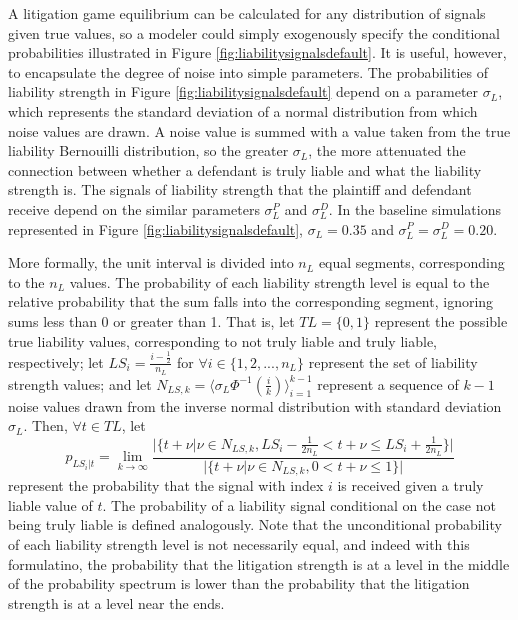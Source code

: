 \documentclass{article}
\begin{document}
A litigation game equilibrium can be calculated for any distribution of signals given true values, so a modeler could simply exogenously specify the conditional probabilities illustrated in Figure \ref{fig:liabilitysignalsdefault}. It is useful, however, to encapsulate the degree of noise into simple parameters. The probabilities of liability strength in Figure \ref{fig:liabilitysignalsdefault} depend on a parameter $\sigma_{L}$, which represents the standard deviation of a normal distribution from which noise values are drawn. A noise value is summed with a value taken from the true liability Bernouilli distribution, so the greater $\sigma_{L}$, the more attenuated the connection between whether a defendant is truly liable and what the liability strength is. The signals of liability strength that the plaintiff and defendant receive depend on the similar parameters $\sigma_{L}^P$ and $\sigma_{L}^D$. In the baseline simulations represented in Figure \ref{fig:liabilitysignalsdefault}, $\sigma_{L}=0.35$ and $\sigma_{L}^P=\sigma_{L}^D=0.20$.

More formally, the unit interval is divided into $n_{L}$ equal segments, corresponding to the $n_{L}$ values. The probability of each liability strength level is equal to the relative probability that the sum falls into the corresponding segment, ignoring sums less than 0 or greater than 1. That is, let $TL=\{0,1\}$ represent the possible true liability values, corresponding to not truly liable and truly liable, respectively; let $LS_i=\frac{i - \frac{1}{2} }{n_{L} }$ for $\forall i \in \{1,2,...,n_{L}\}$ represent the set of liability strength values; and let $N_{LS,k}=\langle\sigma_{L}\Phi^{-1}(\frac{i}{k}) \rangle_{i=1}^{k-1}$ represent a sequence of $k-1$ noise values drawn from the inverse normal  distribution with standard deviation $\sigma_{L}$. Then, $\forall t\in TL$, let 
\begin{equation} 
p_{LS_i|t} = \lim_{k\to\infty} \frac{\lvert\{t+\nu |\nu \in N_{LS,k}, LS_i - \frac{1}{2n_{L} }<t+\nu \leq LS_i + \frac{1}{2n_{L} }\}\rvert}{\lvert\{t+\nu |\nu \in N_{LS,k}, 0<t+\nu \leq 1 \}\rvert}
\end{equation}
represent the probability that the signal with index $i$ is received given a truly liable value of $t$. The probability of a liability signal conditional on the case not being truly liable is defined analogously. Note that the unconditional probability of each liability strength level is not necessarily equal, and indeed with this formulatino, the probability that the litigation strength is at a level in the middle of the probability spectrum is lower than the probability that the litigation strength is at a level near the ends.
\end{document}
